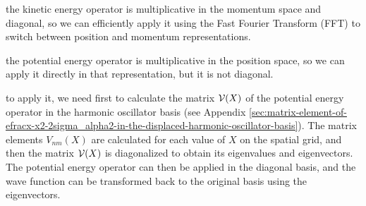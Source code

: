 the kinetic energy operator is multiplicative in the momentum space and diagonal, so we can efficiently apply it using the Fast Fourier Transform (FFT) to switch between position and momentum representations.

the potential energy operator is multiplicative in the position space, so we can apply it directly in that representation, but it is not diagonal.

to apply it, we need first to calculate the matrix ${\cal V}(X)$ of the potential energy operator in the harmonic oscillator basis (see Appendix \ref{sec:matrix-element-of-efracx-x2-2sigma_alpha2-in-the-displaced-harmonic-oscillator-basis}). The matrix elements $V_{nm}(X)$ are calculated for each value of $X$ on the spatial grid, and then the matrix ${\cal V}(X)$ is diagonalized to obtain its eigenvalues and eigenvectors. The potential energy operator can then be applied in the diagonal basis, and the wave function can be transformed back to the original basis using the eigenvectors.

